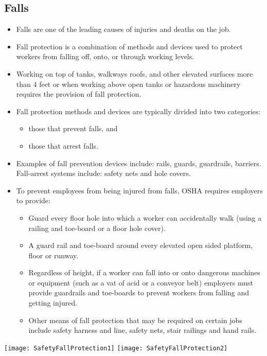 \subsection{Falls}
\begin{itemize}
\item Falls are one of the leading causes of injuries and deaths on the job. 
\item Fall protection is a combination of methods and devices used to protect workers from falling off, onto, or through working levels.
\item Working on top of tanks, walkways roofs, and other elevated surfaces more than 4 feet or when working above open tanks or hazardous machinery requires the provision of fall protection.
\item Fall protection methods and devices are typically divided into two categories: 
\begin{itemize}
\item those that prevent falls, and
\item those that arrest falls.
\end{itemize}
\item Examples of fall prevention devices include: rails, guards, guardrails, barriers.  Fall-arrest systems include: safety nets and hole covers.
\item To prevent employees from being injured from falls, OSHA requires employers to provide:
\begin{itemize}
\item Guard every floor hole into which a worker can accidentally walk (using a railing and toe-board or a floor hole cover).
\item A guard rail and toe-board around every elevated open sided platform, floor or runway.
\item Regardless of height, if a worker can fall into or onto dangerous machines or equipment (such as a vat of acid or a conveyor belt) employers must provide guardrails and toe-boards to prevent workers from falling and getting injured.
\item Other means of fall protection that may be required on certain jobs include safety harness and line, safety nets, stair railings and hand rails.
\end{itemize}
\end{itemize}
\begin{center}
\texttt{[image: SafetyFallProtection1]}\hspace{1cm} \texttt{[image: SafetyFallProtection2]}\\
\end{center}
